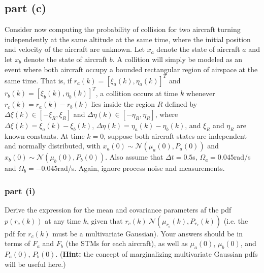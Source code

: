 \documentclass[11pt]{article}
\begin{document}
\subsection*{part (c)}
Consider now computing the probability of collision for two aircraft turning independently at the same altitude at the same time, where the initial position and velocity of the aircraft are unknown. Let $x_a$ denote the state of aircraft $a$ and let $x_b$ denote the state of aircraft $b$. A collition will simply be modeled as an event where both aircraft occupy a bounded rectangular region of airspace at the same time. That is, if $r_a(k)=[\xi_a(k),\eta_a(k)]^T$ and $r_b(k)=[\xi_b(k),\eta_b(k)]^T$, a collition occurs at time $k$ whenever $r_c(k) = r_a(k)-r_b(k)$ lies inside the region $R$ defined by $\Delta\xi(k)\in[-\xi_R,\xi_R]$ and $\Delta\eta(k)\in[-\eta_R,\eta_R]$, where $\Delta\xi(k)=\xi_a(k)-\xi_b(k)$, $\Delta\eta(k)=\eta_a(k)-\eta_b(k)$, and $\xi_R$ and $\eta_R$ are known constants. At time $k=0$, suppose both aircraft states are independent and normally distributed, with $x_a(0)\sim\mathcal{N}(\mu_a(0),P_a(0))$ and $x_b(0)\sim\mathcal{N}(\mu_b(0),P_b(0))$. Also assume that $\Delta t=0.5$s, $\Omega_a=0.045$rad/s and $\Omega_b=-0.045$rad/s. Again, ignore process noise and measurements.

\subsubsection*{part (i)}
Derive the expression for the mean and covariance parameters af the pdf $p(r_c(k))$ at any time $k$, given that $r_c(k)~\mathcal{N}(\mu_{r_c}(k),P_{r_c}(k))$ (i.e. the pdf for $r_c(k)$ must be a multivariate Gaussian). Your answers should be in terms of $F_a$ and $F_b$ (the STMs for each aircraft), as well as $\mu_a(0)$, $\mu_b(0)$, and $P_a(0)$, $P_b(0)$. (\textbf{Hint:} the concept of marginalizing multivariate Gaussian pdfs will be useful here.)
\end{document}
